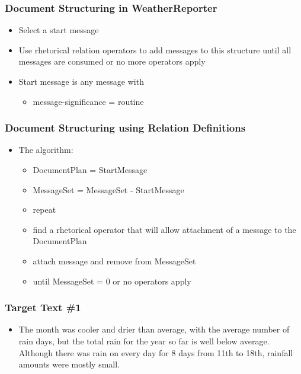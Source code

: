 \documentclass[compress,color=usenames]{beamer}
\begin{document}
\begin{frame}
\frametitle{Document Structuring in WeatherReporter}

\label{f170}
\begin{itemize}
\item { {Select a start message}}
\item { {Use rhetorical relation operators to add messages to this structure until all messages are consumed or no more operators apply}}
\item { {Start message is any message with }}
\begin{itemize}
\item message-significance = routine
\end{itemize}
\end{itemize}
 
\end{frame}

\begin{frame}
\frametitle{Document Structuring using Relation Definitions}

\label{f172}
\begin{itemize}
\item { {The algorithm:}}

\begin{itemize}
\item DocumentPlan = StartMessage
\item MessageSet = MessageSet - StartMessage
\item repeat
\item find a rhetorical operator that will allow attachment of a message to the DocumentPlan 
\item attach message and remove from MessageSet
\item until MessageSet = 0 or no operators apply
\end{itemize}
\end{itemize}
 
\end{frame}

\begin{frame}
\frametitle{Target Text \#1}

\label{f174}
\begin{itemize}
\item { {The month was cooler and drier than average, with the average number of rain days, but the total rain for the year so far is well below average. Although there was rain on every day for 8 days from 11th to 18th, rainfall amounts were mostly small.}}
\end{itemize}
 
\end{frame}
\end{document}
